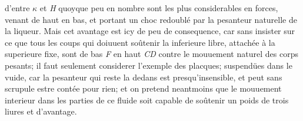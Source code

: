 d'entre $\kappa$ et \textit{H} quoyque peu en nombre sont les plus considerables en forces, venant de haut en bas, et portant un choc\protect{} redoubl\'{e} par la pesanteur naturelle de la liqueur. Mais cet avantage est icy de peu de consequence, car sans insister sur ce que tous les coups qui doiuuent so\^{u}tenir la  inferieure libre, attach\'{e}e \`{a} la superieure fixe, sont de bas \textit{F} en haut \textit{CD} contre le mouuement naturel\protect{} des corps pesants; il faut seulement considerer l'exemple des placques; suspend\"{u}es dans le vuide\protect{}, car la pesanteur  qui reste la dedans est presqu'insensible, et peut sans scrupule estre cont\'{e}e pour rien; et on pretend neantmoins que le mouuement interieur dans les parties de ce fluide\protect{} soit capable de so\^{u}tenir un poids\protect{} de trois liures et d'avantage.
\pend 